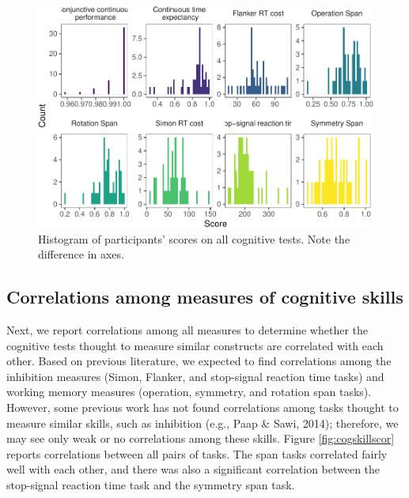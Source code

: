 \documentclass[
  man,floatsintext]{apa6}
\begin{document}
\begin{figure}
\centering
\includegraphics{task_difficulty_ind_dif_files/figure-latex/exp1hist-1.pdf}
\caption{\label{fig:exp1hist}Histogram of participants' scores on all cognitive tests. Note the difference in axes.}
\end{figure}

\hypertarget{correlations-among-measures-of-cognitive-skills}{%
\subsection{Correlations among measures of cognitive skills}\label{correlations-among-measures-of-cognitive-skills}}

Next, we report correlations among all measures to determine whether the cognitive tests thought to measure similar constructs are correlated with each other. Based on previous literature, we expected to find correlations among the inhibition measures (Simon, Flanker, and stop-signal reaction time tasks) and working memory measures (operation, symmetry, and rotation span tasks). However, some previous work has not found correlations among tasks thought to measure similar skills, such as inhibition (e.g., Paap \& Sawi, 2014); therefore, we may see only weak or no correlations among these skills. Figure \ref{fig:cogskillscor} reports correlations between all pairs of tasks. The span tasks correlated fairly well with each other, and there was also a significant correlation between the stop-signal reaction time task and the symmetry span task.
\end{document}
